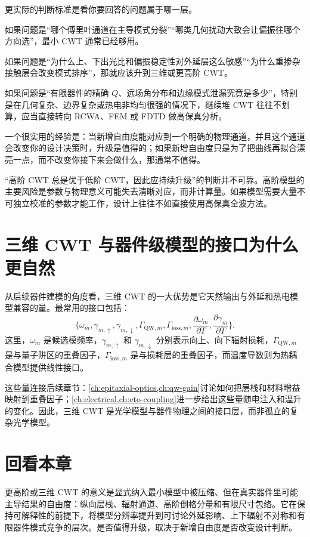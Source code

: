 更实际的判断标准是看你要回答的问题属于哪一层。

如果问题是“哪个傅里叶通道在主导模式分裂”“哪类几何扰动大致会让偏振往哪个方向选”，最小 CWT 通常已经够用。

如果问题是“为什么上、下出光比和偏振稳定性对外延层这么敏感”“为什么重掺杂接触层会改变模式排序”，那就应该升到三维或更高阶 CWT。

如果问题是“有限器件的精确 $Q$、远场角分布和边缘模式泄漏究竟是多少”，特别是在几何复杂、边界复杂或热电非均匀很强的情况下，继续堆 CWT 往往不划算，应当直接转向 RCWA、FEM 或 FDTD 做高保真分析。

一个很实用的经验是：当新增自由度能对应到一个明确的物理通道，并且这个通道会改变你的设计决策时，升级是值得的；如果新增自由度只是为了把曲线再拟合漂亮一点，而不改变你接下来会做什么，那通常不值得。

\begin{PitfallBox}
“高阶 CWT 总是优于低阶 CWT，因此应持续升级”的判断并不可靠。高阶模型的主要风险是参数与物理意义可能失去清晰对应，而非计算量。如果模型需要大量不可独立校准的参数才能工作，设计上往往不如直接使用高保真全波方法。
\end{PitfallBox}

\section{三维 CWT 与器件级模型的接口为什么更自然}
从后续器件建模的角度看，三维 CWT 的一大优势是它天然输出与外延和热电模型兼容的量。最常用的接口包括：
\begin{equation}
\Big\{
\omega_m,
\gamma_{m,\uparrow},
\gamma_{m,\downarrow},
\Gamma_{\mathrm{QW},m},
\Gamma_{\mathrm{loss},m},
\frac{\partial\omega_m}{\partial T},
\frac{\partial\gamma_m}{\partial T}
\Big\}.
\label{eq:3dcwt_interfaces}
\end{equation}
这里，$\omega_m$ 是候选模频率，$\gamma_{m,\uparrow}$ 和 $\gamma_{m,\downarrow}$ 分别表示向上、向下辐射损耗，$\Gamma_{\mathrm{QW},m}$ 是与量子阱区的重叠因子，$\Gamma_{\mathrm{loss},m}$ 是与损耗层的重叠因子，而温度导数则为热耦合模型提供线性接口。

这些量连接后续章节：\cref{ch:epitaxial-optics,ch:qw-gain}讨论如何把层栈和材料增益映射到重叠因子；\cref{ch:electrical,ch:eto-coupling}进一步给出这些量随电注入和温升的变化。因此，三维 CWT 是光学模型与器件物理之间的接口层，而非孤立的复杂光学模型。

\section*{回看本章}
更高阶或三维 CWT 的意义是显式纳入最小模型中被压缩、但在真实器件里可能主导结果的自由度：纵向层栈、辐射通道、高阶倒格分量和有限尺寸包络。它在保持可解释性的前提下，将模型分辨率提升到可讨论外延影响、上下辐射不对称和有限器件模式竞争的层次。是否值得升级，取决于新增自由度是否改变设计判断。

